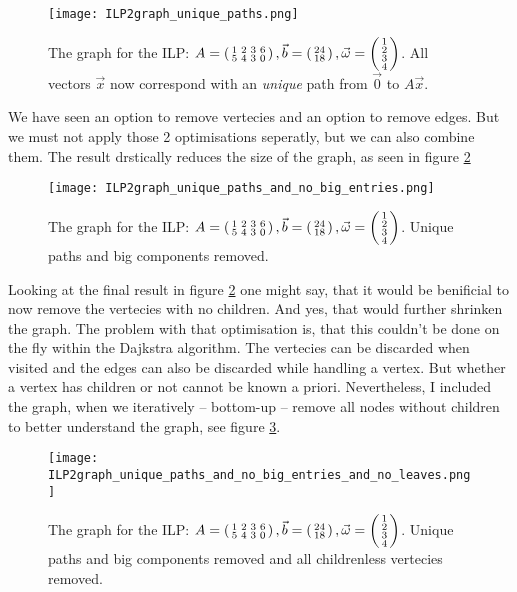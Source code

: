 \begin{figure}
    \texttt{[image: ILP2graph\_unique\_paths.png]}
    \caption{\label{fig:ILP2graph_unique_paths}The graph for the ILP: $A = \left(\begin{smallmatrix}1&2&3&6\\5&4&3&0\end{smallmatrix}\right), \vec b = \left(\begin{smallmatrix}24\\18\end{smallmatrix}\right), \vec \omega = \left(\begin{smallmatrix}1\\2\\3\\4\end{smallmatrix}\right)$. All vectors $\vec x$ now correspond with an \textit{unique} path from $\vec 0$ to $A\vec x$.}
\end{figure}

We have seen an option to remove vertecies and an option to remove edges. But we must not apply those 2 optimisations seperatly, but we can also combine them. The result drstically reduces the size of the graph, as seen in figure \ref{fig:ILP2graph_unique_paths_and_no_big_entries}

\begin{figure}
    \texttt{[image: ILP2graph\_unique\_paths\_and\_no\_big\_entries.png]}
    \caption{\label{fig:ILP2graph_unique_paths_and_no_big_entries}The graph for the ILP: $A = \left(\begin{smallmatrix}1&2&3&6\\5&4&3&0\end{smallmatrix}\right), \vec b = \left(\begin{smallmatrix}24\\18\end{smallmatrix}\right), \vec \omega = \left(\begin{smallmatrix}1\\2\\3\\4\end{smallmatrix}\right)$. Unique paths and big components removed.}
\end{figure}

Looking at the final result in figure \ref{fig:ILP2graph_unique_paths_and_no_big_entries} one might say, that it would be benificial to now remove the vertecies with no children. And yes, that would further shrinken the graph. The problem with that optimisation is, that this couldn't be done on the fly within the Dajkstra algorithm. The vertecies can be discarded when visited and the edges can also be discarded while handling a vertex. But whether a vertex has children or not cannot be known a priori. Nevertheless, I included the graph, when we iteratively – bottom-up – remove all nodes without children to better understand the graph, see figure \ref{fig:ILP2graph_unique_paths_and_no_big_entries_and_no_leaves}.

\begin{figure}
    \texttt{[image: ILP2graph\_unique\_paths\_and\_no\_big\_entries\_and\_no\_leaves.png]}
    \caption{\label{fig:ILP2graph_unique_paths_and_no_big_entries_and_no_leaves}The graph for the ILP: $A = \left(\begin{smallmatrix}1&2&3&6\\5&4&3&0\end{smallmatrix}\right), \vec b = \left(\begin{smallmatrix}24\\18\end{smallmatrix}\right), \vec \omega = \left(\begin{smallmatrix}1\\2\\3\\4\end{smallmatrix}\right)$. Unique paths and big components removed and all childrenless vertecies removed.}
\end{figure}

